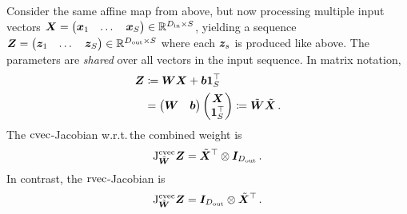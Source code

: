 \begin{example}
  Consider the same affine map from above, but now processing multiple input vectors ${\bm{X}} = \begin{pmatrix}{\bm{x}}_1 & \dots & {\bm{x}}_S\end{pmatrix} \in {\mathbb{R}}^{D_{\text{in}}\times S}$, yielding a sequence ${\bm{Z}} = \begin{pmatrix} {\bm{z}}_1 & \dots & {\bm{z}}_S\end{pmatrix} \in {\mathbb{R}}^{D_{\text{out}}\times S}$ where each ${\bm{z}}_s$ is produced like above.
  The parameters are \emph{shared} over all vectors in the input sequence.
  In matrix notation,
  \begin{align*}
    {\bm{Z}}
    &\coloneqq
      {\bm{W}} {\bm{X}} + {\bm{b}} {\bm{1}}^{\top}_S
    \\
    &=
      \begin{pmatrix}
        {\bm{W}} & {\bm{b}}
      \end{pmatrix}
      \begin{pmatrix}
        {\bm{X}} \\ {\bm{1}}^{\top}_S
      \end{pmatrix}
      \coloneqq
      \tilde{{\bm{W}}}
      \tilde{{\bm{X}}}\,.
  \end{align*}
  The $\operatorname{cvec}$-Jacobian w.r.t.\,the combined weight is
  \begin{align*}
    \mathrm{J}^{\operatorname{cvec}}_{\tilde{{\bm{W}}}}{\bm{Z}}
    =
    \tilde{{\bm{X}}}^{\top}
    \otimes
    {\bm{I}}_{D_{\text{out}}}\,.
  \end{align*}
  In contrast, the $\operatorname{rvec}$-Jacobian is
  \begin{align*}
    \mathrm{J}^{\operatorname{cvec}}_{\tilde{{\bm{W}}}}{\bm{Z}}
    =
    {\bm{I}}_{D_{\text{out}}}
    \otimes
    \tilde{{\bm{X}}}^{\top}\,.
  \end{align*}
\end{example}

\switchcolumn[1]

